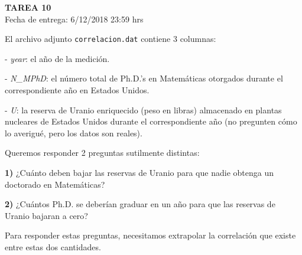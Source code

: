 \documentclass[letter, 11pt]{article}
\newcommand{\tareanro}{10}
\newcommand{\fechaentrega}{6/12/2018 23:59 hrs}
\begin{document}
\thispagestyle{firstpage}

\begin{center}
  {\uppercase{\LARGE \bf Tarea \tareanro}}\\
  Fecha de entrega: \fechaentrega
\end{center}




El archivo adjunto \texttt{correlacion.dat} contiene 3 columnas:


\noindent - \emph{year}: el año de la medición.

\noindent - \emph{N\_MPhD}: el número total de Ph.D.'s en Matemáticas otorgados
  durante el correspondiente año en Estados Unidos.

\noindent - \emph{U}: la reserva de Uranio enriquecido (peso en libras) almacenado en
  plantas nucleares de Estados Unidos durante el correspondiente año (no
  pregunten cómo lo averigué, pero los datos son reales).

\vspace{1em}
Queremos responder 2 preguntas sutilmente distintas:

\noindent\textbf{1)} ¿Cuánto deben bajar las reservas de Uranio para que nadie
obtenga un doctorado en Matemáticas?

\noindent\textbf{2)} ¿Cuántos Ph.D. se deberían graduar en un año para que las
reservas de Uranio bajaran a cero?

Para responder estas preguntas, necesitamos extrapolar la correlación que
existe entre estas dos cantidades.
\end{document}

